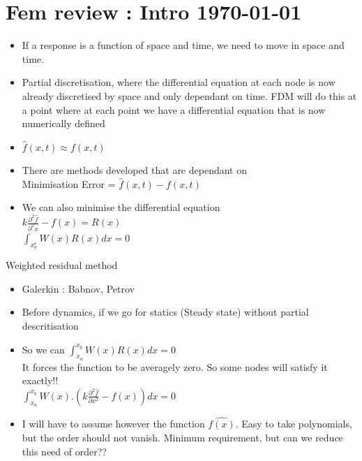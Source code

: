 




	\tableofcontents

\section{Fem review : Intro \today }

	\begin{frame}
		\begin{itemize}
			\item If a response is a function of space and time, we need to move in space and time.
			\item Partial discretisation, where the differential equation at each node is now already discretised by space and only dependant on time. FDM will do this at a  point where at each point we have a differential equation that is now numerically defined
			\item $\hat{f}(x,t) \approx f(x,t)$
			\item There are methods developed that are dependant on \\
			 Minimisation Error  = $\hat{f}(x,t) - f(x,t)$ \\
			 \item We can also minimise the differential equation \\
			  $k \frac{\partial^2 \hat{f}}{\partial^2 x} - f(x) = R(x) $\\
			 $\int_{x_a^e} W(x)R(x) dx = 0$
			
		\end{itemize}
	\end{frame}


	\begin{frame}{Weighted residual method}
		\begin{itemize}
			\item Galerkin : Babnov, Petrov
			\item Before dynamics, if we go for statics (Steady state) without partial descritisation
			\item So we can	$\int_{x_a}^{x_b} W(x)R(x) dx = 0$ \\
			It forces the function to be averagely zero. So some nodes will satisfy it exactly!!\\
				$\int_{x_a}^{x_b} W(x).\left(k \frac{\partial^2 \hat{f}}{\partial x^2} - f(x)  \right) dx = 0$ \\
			\item I will have to assume however the function $\hat{f(x)}$. Easy to take polynomials, but the order should not vanish.  Minimum requirement, but can we reduce this need of order??
		\end{itemize}
	\end{frame}


